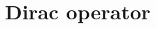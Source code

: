 \documentclass{article}
\theoremstyle{plain} %
\theoremstyle{convention} %
\theoremstyle{remark} %
\numberwithin{equation}{section}
\begin{document}

\newpage

\section{Dirac operator}

\label{sec:dop}

\end{document}
